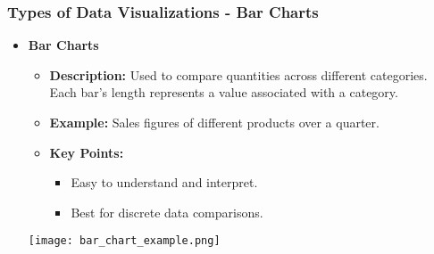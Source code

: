 \documentclass[aspectratio=169]{beamer}
\begin{document}
\begin{frame}[fragile]
    \frametitle{Types of Data Visualizations - Bar Charts}
    \begin{itemize}
        \item \textbf{Bar Charts}
        \begin{itemize}
            \item \textbf{Description:} Used to compare quantities across different categories. Each bar's length represents a value associated with a category.
            \item \textbf{Example:} Sales figures of different products over a quarter.
            \item \textbf{Key Points:}
            \begin{itemize}
                \item Easy to understand and interpret.
                \item Best for discrete data comparisons.
            \end{itemize}
        \end{itemize}
        \texttt{[image: bar\_chart\_example.png]}
    \end{itemize}
\end{frame}
\end{document}
